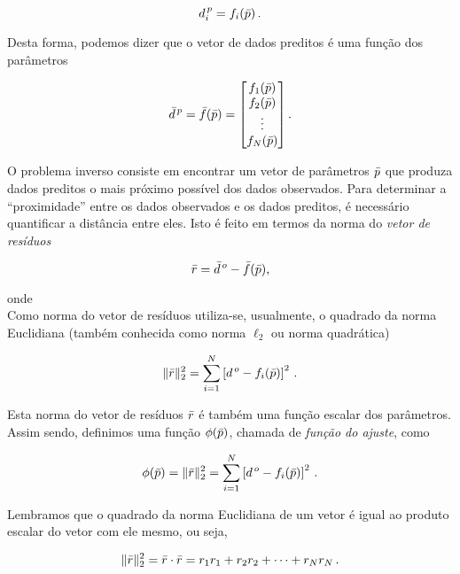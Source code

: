 \[
d^{\thinspace p}_i = f_i(\bar{p})\thinspace.
\]

\noindent Desta forma, podemos dizer que o vetor de dados preditos é uma função
dos parâmetros

\begin{equation}
\bar{d}^{\thinspace p}= \bar{f}(\bar{p}) =
    \begin{bmatrix}
    f_1(\bar{p}) \\
    f_2(\bar{p}) \\
    \vdots \\
    f_N(\bar{p})
    \end{bmatrix}.
\end{equation}

\indent O problema inverso consiste em encontrar um vetor de parâmetros $\bar{p}$
que produza dados preditos o mais próximo possível dos dados observados.
Para determinar a ``proximidade'' entre os dados observados e os dados preditos,
é necessário quantificar a distância entre eles.
Isto é feito em termos da norma do {\it vetor de resíduos}

\begin{equation}
\bar{r} = \bar{d}^{\thinspace o} - \bar{f}(\bar{p}),
\end{equation}

\noindent onde
\\
\indent Como norma do vetor de resíduos utiliza-se, usualmente, o quadrado da
norma Euclidiana (também conhecida como norma $\ell_2$ ou norma quadrática)

\begin{equation}
\lVert\bar{r}\rVert_2^2 =
    \sum\limits_{i=1}^N \left[d^{\thinspace o} - f_i(\bar{p})\right]^2 \, .
\end{equation}

\noindent Esta norma do vetor de resíduos $\bar{r}$ é também uma função escalar
dos parâmetros. Assim sendo, definimos uma função $\phi(\bar{p})$, chamada de
{\it função do ajuste}, como

\begin{equation}
\phi(\bar{p}) = \lVert\bar{r}\rVert_2^2 =
    \sum\limits_{i=1}^N \left[d^{\thinspace o} - f_i(\bar{p})\right]^2 \, .
\label{eq:ajuste_sum}
\end{equation}

\indent Lembramos que o quadrado da norma Euclidiana de um vetor é igual ao
produto escalar do vetor com ele mesmo, ou seja,

\begin{equation}
\lVert\bar{r}\rVert_2^2 = \bar{r} \cdot \bar{r} =
    r_1r_1 + r_2r_2 + \dotsb + r_Nr_N \thinspace .
\label{eq:dotprod}
\end{equation}

